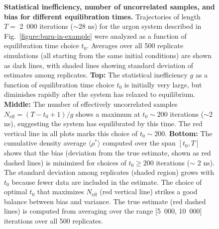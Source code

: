 \documentclass[aps,pre,twocolumn,nofootinbib,superscriptaddress,linenumbers,11point]{revtex4-1}
\newcommand{\expect}[1]{\langle #1 \rangle}                %
\begin{document}
\begin{figure}[tbp]
\caption{\label{figure:reverse-cumulative-average} {\bf Statistical inefficiency, number of uncorrelated samples, and bias for different equilibration times.} 
Trajectories of length $T = $ 2~000 iterations ($\sim$28 ns) for the argon system described in Fig.~\ref{figure:burn-in-example} were analyzed as a function of equilibration time choice $t_0$.
Averages over all 500 replicate simulations (all starting from the same initial conditions) are shown as dark lines, with shaded lines showing standard deviation of estimates among replicates.
{\bf Top:} The statistical inefficiency $g$ as a function of equilibration time choice $t_0$ is initially very large, but diminishes rapidly after the system has relaxed to equilibrium.
{\bf Middle:} The number of effectively uncorrelated samples $N_\mathrm{eff} = (T - t_0 + 1) / g$ shows a maximum at $t_0 \sim 200$ iterations ($\sim$2 ns), suggesting the system has equilibrated by this time.
The red vertical line in all plots marks this choice of $t_0 \sim 200$.
{\bf Bottom:} The cumulative density average $\expect{\rho^*}$ computed over the span $[t_0, T]$ shows that the bias (deviation from the true estimate, shown as red dashed lines) is minimized for choices of $t_0 \ge 200$ iterations ($\sim$ 2 ns).
The standard deviation among replicates (shaded region) grows with $t_0$ because fewer data are included in the estimate.
The choice of optimal $t_0$ that maximizes $N_\mathrm{eff}$ (red vertical line) strikes a good balance between bias and variance.
The true estimate (red dashed lines) is computed from averaging over the range [5~000, 10~000] iterations over all 500 replicates.
}
\end{figure}

\end{document}
